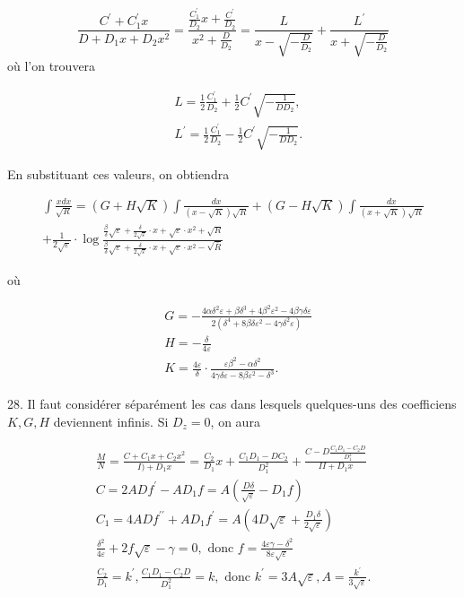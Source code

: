 \documentclass{article}
\begin{document}
\[
\frac{C^{\prime}+C_{1}^{\prime} x}{D+D_{1} x+D_{2} x^{2}}=\frac{\frac{C_{1}^{\prime}}{D_{2}} x+\frac{C^{\prime}}{D_{2}}}{x^{2}+\frac{D}{D_{2}}}=\frac{L}{x-\sqrt{-\frac{D}{D_{2}}}}+\frac{L^{\prime}}{x+\sqrt{-\frac{D}{D_{2}}}}
\]
où l'on trouvera

\[
\begin{aligned}
& L=\frac{1}{2} \frac{C_{1}^{\prime}}{D_{2}}+\frac{1}{2} C^{\prime} \sqrt{-\frac{1}{D D_{2}}}, \\
& L^{\prime}=\frac{1}{2} \frac{C_{1}^{\prime}}{D_{2}}-\frac{1}{2} C^{\prime} \sqrt{-\frac{1}{D D_{2}}} .
\end{aligned}
\]

En substituant ces valeurs, on obtiendra

\[
\begin{gathered}
\int \frac{x d x}{\sqrt{R}}=(G+H \sqrt{K}) \int \frac{d x}{(x-\sqrt{K}) \sqrt{R}}+(G-H \sqrt{K}) \int \frac{d x}{(x+\sqrt{K}) \sqrt{R}} \\
+\frac{1}{2 \sqrt{\varepsilon}} \cdot \log \frac{\frac{\beta}{\delta} \sqrt{\varepsilon}+\frac{\delta}{2 \sqrt{\varepsilon}} \cdot x+\sqrt{\varepsilon} \cdot x^{2}+\sqrt{R}}{\frac{\beta}{\delta} \sqrt{\varepsilon}+\frac{\delta}{2 \sqrt{\varepsilon}} \cdot x+\sqrt{\varepsilon} \cdot x^{2}-\sqrt{\bar{R}}}
\end{gathered}
\]

où

\[
\begin{aligned}
& G=-\frac{4 \alpha \delta^{2} \varepsilon+\beta \delta^{3}+4 \beta^{2} \varepsilon^{2}-4 \beta \gamma \delta \varepsilon}{2\left(\delta^{4}+8 \beta \delta \varepsilon^{2}-4 \gamma \delta^{2} \varepsilon\right)} \\
& H=-\frac{\delta}{4 \varepsilon} \\
& K=\frac{4 \varepsilon}{\delta} \cdot \frac{\varepsilon \beta^{2}-\alpha \delta^{2}}{4 \gamma \delta \varepsilon-8 \beta \varepsilon^{2}-\delta^{3}} .
\end{aligned}
\]

28. Il faut considérer séparément les cas dans lesquels quelques-uns des coefficiens \(K, G, H\) deviennent infinis. Si \(D_{z}=0\), on aura

\[
\begin{gathered}
\frac{M}{N}=\frac{C+C_{1} x+C_{2} x^{2}}{I)+D_{1} x}=\frac{C_{2}}{D_{1}} x+\frac{C_{1} D_{1}-D C_{2}}{D_{1}^{2}}+\frac{C-D \frac{C_{1} D_{1}-C_{2} D}{D_{1}^{2}}}{I I+D_{1} x} \\
C=2 A D f^{\prime}-A D_{1} f=A\left(\frac{D \delta}{\sqrt{\varepsilon}}-D_{1} f\right) \\
C_{1}=4 A D f^{\prime \prime}+A D_{1} f^{\prime}=A\left(4 D \sqrt{\varepsilon}+\frac{D_{1} \delta}{2 \sqrt{\varepsilon}}\right) \\
\frac{\delta^{2}}{4 \varepsilon}+2 f \sqrt{\varepsilon}-\gamma=0, \text { donc } f=\frac{4 \varepsilon \gamma-\delta^{2}}{8 \varepsilon \sqrt{\varepsilon}} \\
\frac{C_{2}}{D_{1}}=k^{\prime}, \frac{C_{1} D_{1}-C_{2} D}{D_{1}^{2}}=k, \text { donc } k^{\prime}=3 A \sqrt{\varepsilon}, A=\frac{k^{\prime}}{3 \sqrt{\varepsilon}} .
\end{gathered}
\]
\end{document}
